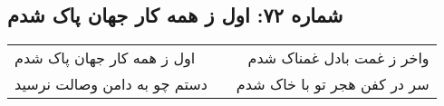\begin{center}
\section*{شماره ۷۲: اول ز همه کار جهان پاک شدم}
\label{sec:072}
\begin{longtable}{l p{0.5cm} r}
اول ز همه کار جهان پاک شدم
&&
واخر ز غمت بادل غمناک شدم
\\
دستم چو به دامن وصالت نرسید
&&
سر در کفن هجر تو با خاک شدم
\\
\end{longtable}
\end{center}

